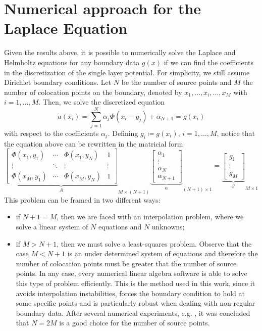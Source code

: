 \section{Numerical approach for the Laplace Equation}\label{n_a_MFS_lap}
Given the results above, it is possible to numerically solve the Laplace and Helmholtz equations for any boundary data \(g(x)\) if we can find the coefficients in the discretization of the single layer potential. For simplicity, we still assume Dirichlet boundary conditions. Let \(N\) be the number of source points and \(M\) the number of colocation points on the boundary, denoted by \(x_1,\dots,x_i,\dots,x_M\) with \(i=1,\dots,M\). Then, we solve the discretized equation
\[
    \tilde{u}(x_i) = \sum_{j=1}^{N} \alpha_j \Phi(x_i-y_j) + \alpha_{N+1} = g(x_i)    
\]
with respect to the coefficients \(\alpha_j\). Defining \(g_i \coloneq g(x_i), \, i=1,\dots,M\), notice that the equation above can be rewritten in the matricial form
\begin{equation}\label{MFS_m_system}
    {\underbrace{\begin{bmatrix}
        \Phi(x_1, y_1) & \cdots & \Phi(x_1, y_N) & 1 \\
        \vdots & \ddots & \vdots & \vdots\\
        \Phi(x_M, y_1) & \cdots & \Phi(x_M, y_N) & 1
    \end{bmatrix}}_{A}}_{M\times (N+1)}
    {\underbrace{\begin{bmatrix}
        \alpha_1\\
        \vdots\\
        \alpha_N\\
        \alpha_{N+1}
    \end{bmatrix}}_\alpha}_{(N+1)\times 1}
    =
    {\underbrace{\begin{bmatrix}
        g_1\\
        \vdots\\
        g_M
    \end{bmatrix}}_g}_{M\times 1}
\end{equation}
This problem can be framed in two different ways:
\begin{itemize}
    \item if \(N+1=M\), then we are faced with an interpolation problem, where we solve a linear system of \(N\) equations and \(N\) unknowns;
    \item if \(M > N+1\), then we must solve a least-squares problem. Observe that the case \(M < N+1\) is an under determined system of equations and therefore the number of colocation points must be greater that the number of source points. In any case, every numerical linear algebra software is able to solve this type of problem efficiently. This is the method used in this work, since it avoids interpolation instabilities, forces the boundary condition to hold at some specific points and is particularly robust when dealing with non-regular boundary data.  After several numerical experiments, e.g. \cite{alves2009choice}, it was concluded that \(N=2M\) is a good choice for the number of source points.
\end{itemize}

